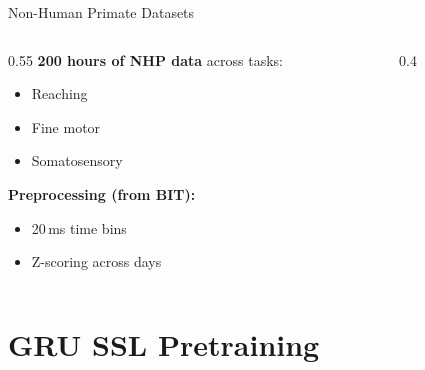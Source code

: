 \documentclass[aspectratio=169]{beamer}
\begin{document}
\begin{frame}{Non-Human Primate Datasets}
  \begin{columns}
    \begin{column}{0.55\textwidth}
      \textbf{200 hours of NHP data} across tasks:
      \begin{itemize}
        \item Reaching
        \item Fine motor
        \item Somatosensory
      \end{itemize}
      \vspace{0.5em}
      \textbf{Preprocessing (from BIT):}
      \begin{itemize}
        \item 20\,ms time bins
        \item Z-scoring across days
      \end{itemize}
    \end{column}
    \begin{column}{0.4\textwidth}
      \begin{center}
      \end{center}
    \end{column}
  \end{columns}
\end{frame}

\section{GRU SSL Pretraining}
\end{document}
